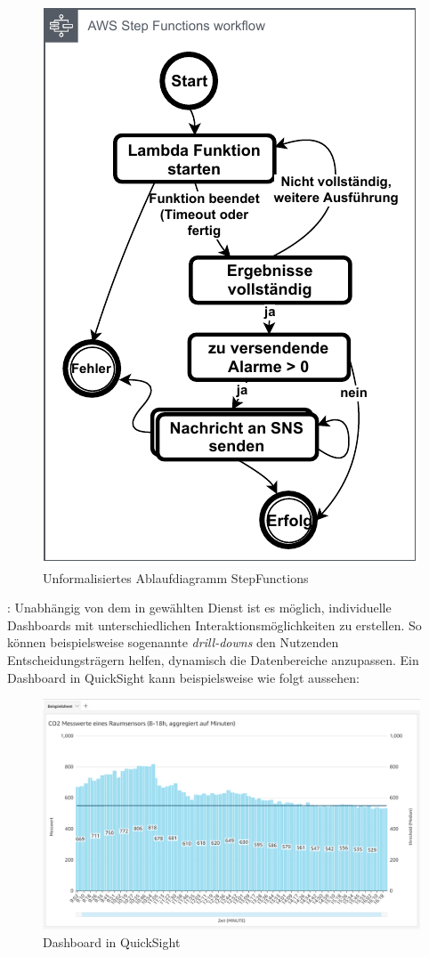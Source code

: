 \begin{figure}[H]
\centering
\includegraphics[height=0.45\textheight]{graphics/Zustaende-DB-RA.pdf}
\caption{Unformalisiertes Ablaufdiagramm StepFunctions}
\label{abb:StepFunctionsRA}
\end{figure}

: Unabhängig von dem in  gewählten Dienst ist es möglich, individuelle Dashboards mit unterschiedlichen Interaktionsmöglichkeiten zu erstellen. So können beispielsweise sogenannte \textit{drill-downs} den Nutzenden Entscheidungsträgern helfen, dynamisch die Datenbereiche anzupassen. Ein Dashboard in QuickSight kann beispielsweise wie folgt aussehen:
\begin{figure}[H]
\centering
\includegraphics[width=\textwidth]{graphics/QuickSight-Beispiel.png}
\caption{Dashboard in QuickSight}
\label{abb:DashboardDBRA}
\end{figure}


